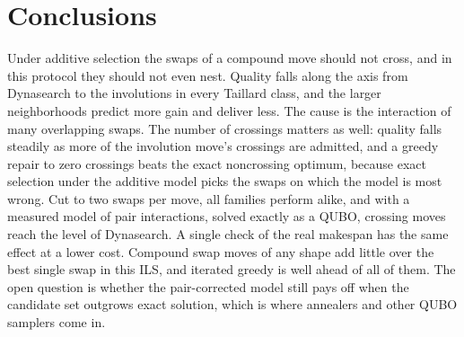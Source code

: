 \documentclass[10pt,twocolumn]{article}
\begin{document}
\section{Conclusions}
Under additive selection the swaps of a compound move should not
cross, and in this protocol they should not even nest. Quality falls
along the axis from Dynasearch to the involutions in every Taillard
class, and the larger neighborhoods predict more gain and deliver less.
The cause is the interaction of many overlapping swaps. The number of
crossings matters as well: quality falls steadily as more of the
involution move's crossings are admitted, and a greedy repair to zero
crossings beats the exact noncrossing optimum, because exact selection
under the additive model picks the swaps on which the model is most
wrong. Cut to two
swaps per move, all families perform alike, and with a measured model of
pair interactions, solved exactly as a QUBO, crossing moves reach the
level of Dynasearch. A single check of the real makespan has the same
effect at a lower cost. Compound swap moves of any shape add little over
the best single swap in this ILS, and iterated greedy is well ahead of
all of them. The open question is whether the pair-corrected model still
pays off when the candidate set outgrows exact solution, which is where
annealers and other QUBO samplers come in.
\end{document}
